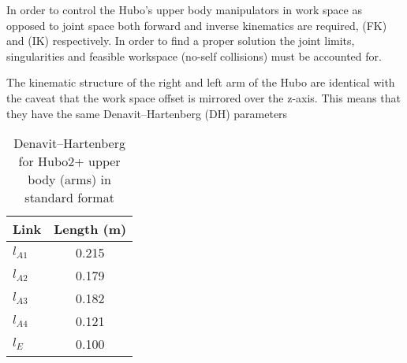 In order to control the Hubo's upper body manipulators in work space as opposed to joint space both forward and inverse kinematics are required, (FK) and (IK) respectively.
In order to find a proper solution the joint limits, singularities and feasible workspace (no-self collisions) must be accounted for.

The kinematic structure of the right and left arm of the Hubo are identical with the caveat that the work space offset is mirrored over the z-axis.
This means that they have the same Denavit–Hartenberg (DH) parameters

\begin{table}
\centering
\caption{Denavit–Hartenberg for Hubo2+ upper body (arms) in standard format}
\begin{tabular}{|l | c|}
\hline
Link     & Length (m) \\
\hline
\hline
$l_{A1}$ & 0.215 \\
\hline
$l_{A2}$ & 0.179 \\
\hline
$l_{A3}$ & 0.182 \\
\hline
$l_{A4}$ & 0.121 \\
\hline
$l_{E}$ & 0.100 \\

\hline

\end{tabular}\label{table:DHupper}
\end{table}

